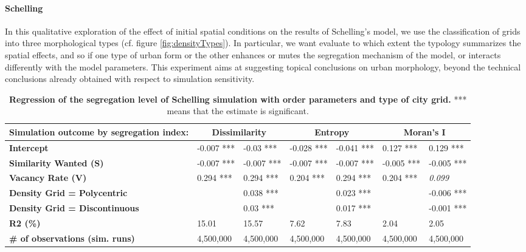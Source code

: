 \documentclass[Royal,sageh,times]{sagej}
\begin{document}

\paragraph{Schelling} In this qualitative exploration of the effect of initial spatial conditions on the results of Schelling's model, we use the classification of grids into three morphological types (cf. figure \ref{fig:densityTypes}). In particular, we want evaluate to which extent the typology summarizes the spatial effects, and so if one type of urban form or the other enhances or mutes the segregation mechanism of the model, or interacts differently with the model parameters. This experiment aims at suggesting topical conclusions on urban morphology, beyond the technical conclusions already obtained with respect to simulation sensitivity.

\begin{table}[htbp]
\centering
\begin{tabular}{|l|ll|ll|ll|}
\hline
Simulation outcome by segregation index: & \multicolumn{2}{c|}{\textbf{Dissimilarity}} & \multicolumn{2}{c|}{\textbf{Entropy}} & \multicolumn{2}{c|}{\textbf{Moran's I}} \\ \hline
\textbf{Intercept}                       & -0.007 ***  & -0.03 ***                     & -0.028 ***        & -0.041 ***        & 0.127 ***        & 0.129 ***            \\ \hline
\textbf{Similarity Wanted (S)}           & -0.007 ***  & -0.007 ***                    & -0.007 ***        & -0.007 ***        & -0.005 ***       & -0.005 ***           \\ 
\textbf{Vacancy Rate (V)}                & 0.294 ***   & 0.294 ***                     & 0.204 ***         & 0.294 ***         & 0.204 ***        & \textit{0.099}       \\ \hline
\textbf{Density Grid = Polycentric}      &             & 0.038 ***                     &                   & 0.023 ***         &                  & -0.006 ***           \\ 
\textbf{Density Grid = Discontinuous}    &             & 0.03 ***                     &                   & 0.017 ***         &                  & -0.001 ***           \\ \hline
\textbf{R2 (\%)}                         & 15.01       & 15.57  & 7.62              & 7.83              & 2.04             & 2.05                 \\ 
\textbf{\# of observations (sim. runs)}  & 4,500,000   & 4,500,000                     & 4,500,000         & 4,500,000         & 4,500,000        & 4,500,000            \\ \hline
\end{tabular}
\caption{\textbf{Regression of the segregation level of Schelling simulation with order parameters and type of city grid.} *** means that the estimate is significant.}
\label{tab:regressionSchelling}
\end{table}
\end{document}
